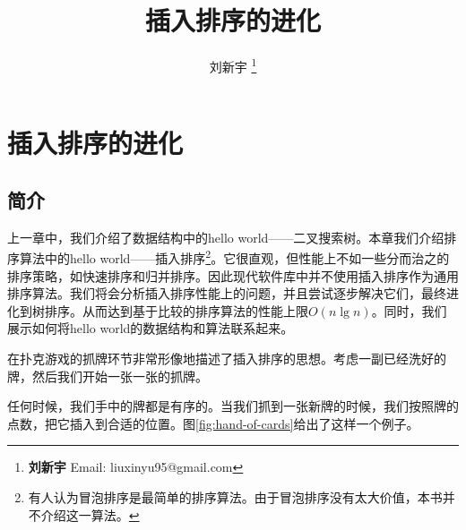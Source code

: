\documentclass[UTF8]{article}
\begin{document}


\title{插入排序的进化}

\author{刘新宇
\thanks{{\bfseries 刘新宇} \newline
  Email: liuxinyu95@gmail.com \newline}
  }

\maketitle
\fi


\ifx\wholebook\relax
\chapter{插入排序的进化}
\fi

\section{简介}
\label{introduction} 
上一章中，我们介绍了数据结构中的hello world——二叉搜索树。本章我们介绍排序算法中的hello world——插入排序\footnote{有人认为冒泡排序是最简单的排序算法。由于冒泡排序没有太大价值，本书并不介绍这一算法\cite{wiki-bubble-sort}。}。它很直观，但性能上不如一些分而治之的排序策略，如快速排序和归并排序。因此现代软件库中并不使用插入排序作为通用排序算法。我们将会分析插入排序性能上的问题，并且尝试逐步解决它们，最终进化到树排序。从而达到基于比较的排序算法的性能上限$O(n \lg n)$。同时，我们展示如何将hello world的数据结构和算法联系起来。

在扑克游戏的抓牌环节非常形像地描述了插入排序的思想\cite{CLRS}。考虑一副已经洗好的牌，然后我们开始一张一张的抓牌。

任何时候，我们手中的牌都是有序的。当我们抓到一张新牌的时候，我们按照牌的点数，把它插入到合适的位置。图\ref{fig:hand-of-cards}给出了这样一个例子。
\end{document}
